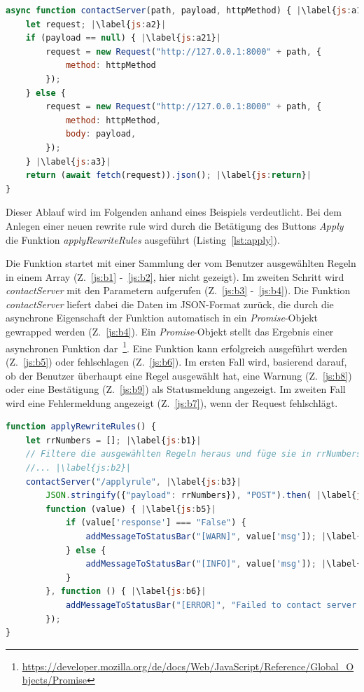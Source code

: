 \begin{lstlisting}[language=JavaScript, escapechar=|, caption=Auszug aus der Datei \textit{index.js}, label={lst:js}]
async function contactServer(path, payload, httpMethod) { |\label{js:a1}|
    let request; |\label{js:a2}|
    if (payload == null) { |\label{js:a21}|
        request = new Request("http://127.0.0.1:8000" + path, {
            method: httpMethod
        });
    } else {
        request = new Request("http://127.0.0.1:8000" + path, {
            method: httpMethod,
            body: payload,
        });
    } |\label{js:a3}|
    return (await fetch(request)).json(); |\label{js:return}|
}
\end{lstlisting} 

Dieser Ablauf wird im Folgenden anhand eines Beispiels verdeutlicht.
Bei dem Anlegen einer neuen rewrite rule wird durch die Betätigung des Buttons \textit{Apply} die Funktion \textit{applyRewriteRules} ausgeführt (Listing~\ref{lst:apply}).

Die Funktion startet mit einer Sammlung der vom Benutzer ausgewählten Regeln in einem Array (Z.~\ref{js:b1} -~\ref{js:b2}, hier nicht gezeigt).
Im zweiten Schritt wird \textit{contactServer} mit den Parametern aufgerufen (Z.~\ref{js:b3} -~\ref{js:b4}).
Die Funktion \textit{contactServer} liefert dabei die Daten im JSON-Format zurück, die durch die asynchrone Eigenschaft der Funktion automatisch in ein \textit{Promise}-Objekt gewrapped werden (Z.~\ref{js:b4}).
Ein \textit{Promise}-Objekt stellt das Ergebnis einer asynchronen Funktion dar~\footnote{\hspace{1.5mm}\url{https://developer.mozilla.org/de/docs/Web/JavaScript/Reference/Global_Objects/Promise}}.
Eine Funktion kann erfolgreich ausgeführt werden (Z.~\ref{js:b5}) oder fehlschlagen (Z.~\ref{js:b6}). Im ersten Fall wird, basierend darauf, ob der Benutzer überhaupt eine Regel ausgewählt hat,
eine Warnung (Z.~\ref{js:b8}) oder eine Bestätigung (Z.~\ref{js:b9}) als Statusmeldung angezeigt.
Im zweiten Fall wird eine Fehlermeldung angezeigt (Z.~\ref{js:b7}), wenn der Request fehlschlägt.

\begin{lstlisting}[language=JavaScript, escapechar=|, caption=Funktion \textit{applyRewriteRules()} aus der Datei \textit{index.js}, label={lst:apply}]
function applyRewriteRules() {
    let rrNumbers = []; |\label{js:b1}|
    // Filtere die ausgewählten Regeln heraus und füge sie in rrNumbers ein
    //... |\label{js:b2}|
    contactServer("/applyrule", |\label{js:b3}|
        JSON.stringify({"payload": rrNumbers}), "POST").then( |\label{js:b4}|
        function (value) { |\label{js:b5}|
            if (value['response'] === "False") {
                addMessageToStatusBar("[WARN]", value['msg']); |\label{js:b8}|
            } else {
                addMessageToStatusBar("[INFO]", value['msg']); |\label{js:b9}|
            }
        }, function () { |\label{js:b6}|
            addMessageToStatusBar("[ERROR]", "Failed to contact server."); |\label{js:b7}|
        }); 
}
\end{lstlisting} 
